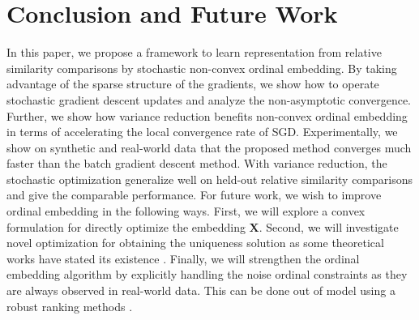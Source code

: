 \documentclass[letterpaper]{article}
\begin{document}
		

		\section{Conclusion and Future Work}

		In this paper, we propose a framework to learn representation from relative similarity comparisons by stochastic non-convex ordinal embedding. By taking advantage of the sparse structure of the gradients, we show how to operate stochastic gradient descent updates and analyze the non-asymptotic convergence. Further, we show how variance reduction benefits non-convex ordinal embedding in terms of accelerating the local convergence rate of SGD. Experimentally, we show on synthetic and real-world data that the proposed method converges much faster than the batch gradient descent method. With variance reduction, the stochastic optimization generalize well on held-out relative similarity comparisons and give the comparable performance. For future work, we wish to improve ordinal embedding in the following ways. First, we will explore a convex formulation for directly optimize the embedding $\mathbf{X}$. Second, we will investigate novel optimization for obtaining the uniqueness solution as some theoretical works have stated its existence \cite{2015arXiv150102861A,53e99af7b7602d97023851bf}. Finally, we will strengthen the ordinal embedding algorithm by explicitly handling the noise ordinal constraints as they are always observed in real-world data. This can be done out of model using a robust ranking methods \cite{2014arXiv1408.3467X}.

		
		

	
\end{document}
